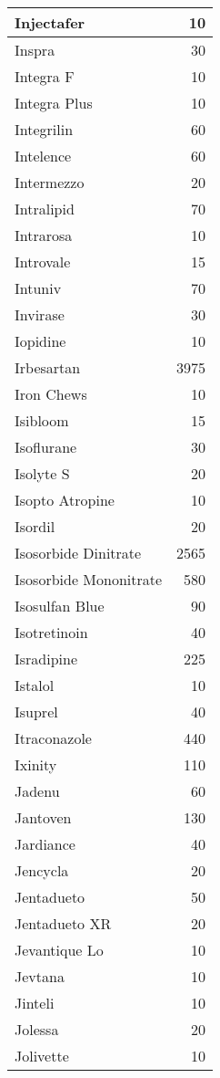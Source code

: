 \documentclass[
]{article}
\begin{document}
\begin{table}
\begin{tabular}[t]{l|r}
\hline
Injectafer & 10\\
\hline
Inspra & 30\\
\hline
Integra F & 10\\
\hline
Integra Plus & 10\\
\hline
Integrilin & 60\\
\hline
Intelence & 60\\
\hline
Intermezzo & 20\\
\hline
Intralipid & 70\\
\hline
Intrarosa & 10\\
\hline
Introvale & 15\\
\hline
Intuniv & 70\\
\hline
Invirase & 30\\
\hline
Iopidine & 10\\
\hline
Irbesartan & 3975\\
\hline
Iron Chews & 10\\
\hline
Isibloom & 15\\
\hline
Isoflurane & 30\\
\hline
Isolyte S & 20\\
\hline
Isopto Atropine & 10\\
\hline
Isordil & 20\\
\hline
Isosorbide Dinitrate & 2565\\
\hline
Isosorbide Mononitrate & 580\\
\hline
Isosulfan Blue & 90\\
\hline
Isotretinoin & 40\\
\hline
Isradipine & 225\\
\hline
Istalol & 10\\
\hline
Isuprel & 40\\
\hline
Itraconazole & 440\\
\hline
Ixinity & 110\\
\hline
Jadenu & 60\\
\hline
Jantoven & 130\\
\hline
Jardiance & 40\\
\hline
Jencycla & 20\\
\hline
Jentadueto & 50\\
\hline
Jentadueto XR & 20\\
\hline
Jevantique Lo & 10\\
\hline
Jevtana & 10\\
\hline
Jinteli & 10\\
\hline
Jolessa & 20\\
\hline
Jolivette & 10\\

\end{tabular}
\end{table}
\end{document}
